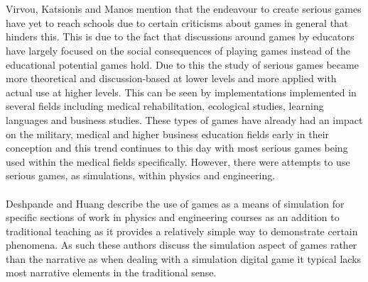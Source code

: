 \documentclass[conference]{IEEEtran}
\begin{document}
\\\\
Virvou, Katsionis and Manos\cite{Virvou2005} mention that the endeavour to create serious games have yet to reach schools due to certain criticisms about games in general that hinders this. This is due to the fact that discussions around games by educators have largely focused on the social consequences of playing games instead of the educational potential games hold\cite{Squire2003}. Due to this the study of serious games became more theoretical and discussion-based at lower levels and more applied with actual use at higher levels. This can be seen by implementations implemented in several fields including medical rehabilitation, ecological studies, learning languages and business studies\cite{Burke2009, Costanza2014, Ranalli2008, Tao2009}. These types of games have already had an impact on the military, medical and higher business education fields early in their conception and this trend continues to this day with most serious games being used within the medical fields specifically\cite{Annetta2008, DeGloria2014}. However, there were attempts to use serious games, as simulations, within physics and engineering\cite{Deshpande2011}.
\\\\
Deshpande and Huang\cite{Deshpande2011} describe the use of games as a means of simulation for specific sections of work in physics and engineering courses as an addition to traditional teaching as it provides a relatively simple way to demonstrate certain phenomena. As such these authors discuss the simulation aspect of games rather than the narrative as when dealing with a simulation digital game it typical lacks most narrative elements in the traditional sense\cite{Deshpande2011}.
\end{document}
